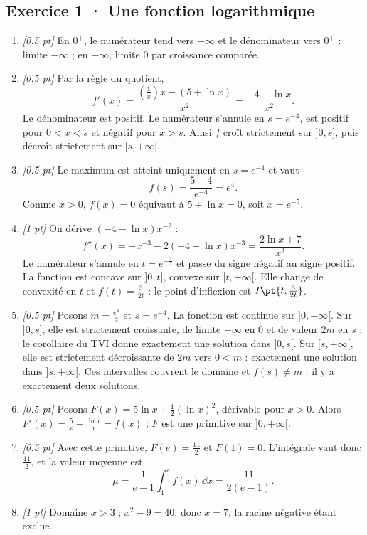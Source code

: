 \subsection*{Exercice 1 · Une fonction logarithmique}\begin{enumerate}

\item \textit{[\num{0,5} pt]} En $0^+$, le numérateur tend vers $-\infty$ et le dénominateur vers $0^+$ : limite $-\infty$ ; en $+\infty$, limite $0$ par croissance comparée.

\item \textit{[\num{0,5} pt]} Par la règle du quotient,
\[f'(x)=\frac{(\frac{1}{x})x-(5+\ln x)}{x^2}=\frac{-4-\ln x}{x^2}.\]
Le dénominateur est positif. Le numérateur s'annule en $s=e^{-4}$, est positif pour $0<x<s$ et négatif pour $x>s$. Ainsi $f$ croît strictement sur $]0,s]$, puis décroît strictement sur $[s,+\infty[$.

\item \textit{[\num{0,5} pt]} Le maximum est atteint uniquement en $s=e^{-4}$ et vaut
\[f(s)=\frac{5- 4}{e^{-4}}=e^{4}.\]
Comme $x>0$, $f(x)=0$ équivaut à $5+\ln x=0$, soit $x=e^{-5}$.

\item \textit{[1 pt]} On dérive $(-4-\ln x)x^{-2}$ :
\[f''(x)=-x^{-3}-2(-4-\ln x)x^{-3}=\frac{2\ln x+7}{x^3}.\]
Le numérateur s'annule en $t=e^{-\frac{7}{2}}$ et passe du signe négatif au signe positif. La fonction est concave sur $]0,t]$, convexe sur $[t,+\infty[$. Elle change de convexité en $t$ et $f(t)=\frac{3}{2t}$ : le point d'inflexion est $I\pt{t;\frac{3}{2t}}$.

\item \textit{[\num{0,5} pt]} Posons $m=\frac{e^{4}}{2}$ et $s=e^{-4}$. La fonction est continue sur $]0,+\infty[$. Sur $]0,s]$, elle est strictement croissante, de limite $-\infty$ en $0$ et de valeur $2m$ en $s$ : le corollaire du TVI donne exactement une solution dans $]0,s[$. Sur $[s,+\infty[$, elle est strictement décroissante de $2m$ vers $0<m$ : exactement une solution dans $]s,+\infty[$. Ces intervalles couvrent le domaine et $f(s)\ne m$ : il y a exactement deux solutions.

\item \textit{[\num{0,5} pt]} Posons $F(x)=5\ln x+\frac12(\ln x)^2$, dérivable pour $x>0$. Alors $F'(x)=\frac{5}{x}+\frac{\ln x}{x}=f(x)$ ; $F$ est une primitive sur $]0,+\infty[$.

\item \textit{[\num{0,5} pt]} Avec cette primitive, $F(e)=\frac{11}{2}$ et $F(1)=0$. L'intégrale vaut donc $\frac{11}{2}$, et la valeur moyenne est
\[\mu=\frac{1}{e-1}\int_1^e f(x)\,\dd x=\frac{11}{2(e-1)}.\]

\item \textit{[1 pt]} Domaine $x>3$ ; $x^2-9=40$, donc $x=7$, la racine négative étant exclue.

\end{enumerate}

